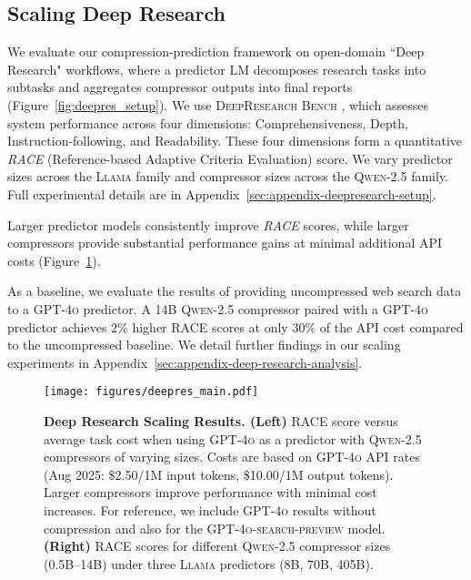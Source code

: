 \documentclass{article} %
\begin{document}
\subsection{Scaling Deep Research}
\label{sec:scaling-deepresearch}
We evaluate our compression-prediction framework on open-domain ``Deep Research" workflows, where a predictor LM decomposes research tasks into subtasks and aggregates compressor outputs into final reports (Figure~\ref{fig:deepres_setup}). We use \textsc{DeepResearch Bench} \citep{du2025deepresearch}, which assesses system performance across four dimensions: Comprehensiveness, Depth, Instruction-following, and Readability. These four dimensions form a quantitative \textit{RACE} (Reference-based Adaptive Criteria Evaluation) score. We vary predictor sizes across the \textsc{Llama} family and compressor sizes across the \textsc{Qwen-2.5} family. Full experimental details are in Appendix~\ref{sec:appendix-deepresearch-setup}.

Larger predictor models consistently improve \textit{RACE} scores, while larger compressors provide substantial performance gains at minimal additional API costs (Figure~\ref{fig:deepres_main}).

As a baseline, we evaluate the results of providing uncompressed web search data to a \textsc{GPT-4o} predictor. A 14B \textsc{Qwen-2.5} compressor paired with a \textsc{GPT-4o} predictor achieves $2\%$ higher RACE scores at only 30\% of the API cost compared to the uncompressed baseline. We detail further findings in our scaling experiments in Appendix~\ref{sec:appendix-deep-research-analysis}.

\begin{figure}[h]
    \centering
    \texttt{[image: figures/deepres\_main.pdf]}
    \caption{\textbf{Deep Research Scaling Results. (Left)
    } RACE score versus average task cost when using \textsc{GPT-4o} as a predictor with \textsc{Qwen-2.5} compressors of varying sizes. Costs are based on \textsc{GPT-4o} API rates (Aug 2025: \$2.50/1M input tokens, \$10.00/1M output tokens). Larger compressors improve performance with minimal cost increases. For reference, we include \textsc{GPT-4o} results without compression and also for the \textsc{GPT-4o-search-preview} model.
    \textbf{(Right)} RACE scores for different \textsc{Qwen-2.5} compressor sizes (0.5B–14B) under three \textsc{Llama} predictors (8B, 70B, 405B). 
    }
    \label{fig:deepres_main}
\end{figure}
\end{document}
